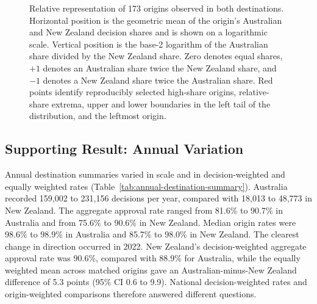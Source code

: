 \documentclass[runningheads]{llncs}
\begin{document}
\begin{figure}
\centering

\caption{Relative representation of 173 origins observed in both destinations. Horizontal position is the geometric mean of the origin's Australian and New Zealand decision shares and is shown on a logarithmic scale. Vertical position is the base-2 logarithm of the Australian share divided by the New Zealand share. Zero denotes equal shares, $+1$ denotes an Australian share twice the New Zealand share, and $-1$ denotes a New Zealand share twice the Australian share. Red points identify reproducibly selected high-share origins, relative-share extrema, upper and lower boundaries in the left tail of the distribution, and the leftmost origin.}
\label{fig:relative-origin-representation}
\end{figure}

\subsection{Supporting Result: Annual Variation}

Annual destination summaries varied in scale and in decision-weighted and equally weighted rates (Table~\ref{tab:annual-destination-summary}). Australia recorded 159,002 to 231,156 decisions per year, compared with 18,013 to 48,773 in New Zealand. The aggregate approval rate ranged from 81.6\% to 90.7\% in Australia and from 75.6\% to 90.6\% in New Zealand. Median origin rates were 98.6\% to 98.9\% in Australia and 85.7\% to 98.0\% in New Zealand. The clearest change in direction occurred in 2022. New Zealand's decision-weighted aggregate approval rate was 90.6\%, compared with 88.9\% for Australia, while the equally weighted mean across matched origins gave an Australian-minus-New Zealand difference of 5.3 points (95\% CI 0.6 to 9.9). National decision-weighted rates and origin-weighted comparisons therefore answered different questions.
\end{document}
